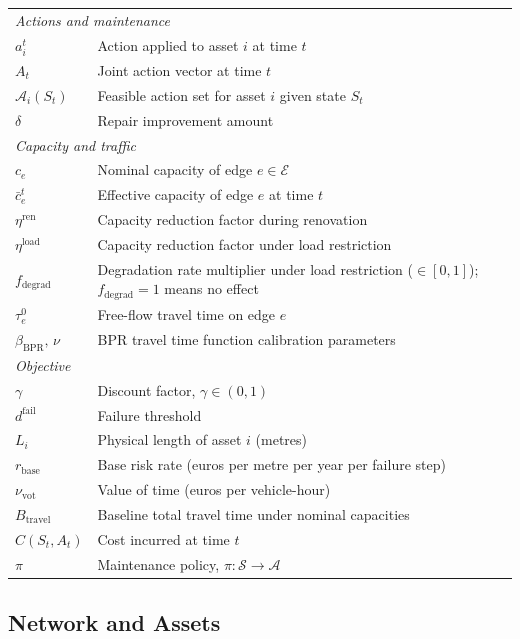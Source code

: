 \documentclass[3p, twocolumn]{elsarticle}
\begin{document}
\begin{table}[htpb]
\begin{tabular}{ll}
\hline
\multicolumn{2}{l}{\textit{Actions and maintenance}} \\
$a_i^t$ & Action applied to asset $i$ at time $t$ \\
$A_t$ & Joint action vector at time $t$ \\
$\mathcal{A}_i(S_t)$ & Feasible action set for asset $i$ given state $S_t$ \\
$\delta$ & Repair improvement amount \\
\hline
\multicolumn{2}{l}{\textit{Capacity and traffic}} \\
$c_e$ & Nominal capacity of edge $e \in \mathcal{E}$ \\
$\bar{c}_e^t$ & Effective capacity of edge $e$ at time $t$ \\
$\eta^{\text{ren}}$ & Capacity reduction factor during renovation \\
$\eta^{\text{load}}$ & Capacity reduction factor under load restriction \\
$f_{\text{degrad}}$ & Degradation rate multiplier under load restriction ($\in [0,1]$); $f_{\text{degrad}} = 1$ means no effect \\
$\tau_e^0$ & Free-flow travel time on edge $e$ \\
$\beta_{\text{BPR}},\, \nu$ & BPR travel time function calibration parameters \\
\hline
\multicolumn{2}{l}{\textit{Objective}} \\
$\gamma$ & Discount factor, $\gamma \in (0, 1)$ \\
$d^{\text{fail}}$ & Failure threshold \\
$L_i$ & Physical length of asset $i$ (metres) \\
$r_{\text{base}}$ & Base risk rate (euros per metre per year per failure step) \\
$\nu_{\text{vot}}$ & Value of time (euros per vehicle-hour) \\
$B_{\text{travel}}$ & Baseline total travel time under nominal capacities \\
$C(S_t, A_t)$ & Cost incurred at time $t$ \\
$\pi$ & Maintenance policy, $\pi: \mathcal{S} \rightarrow \mathcal{A}$ \\
\hline
\end{tabular}
\end{table}

\subsection{Network and Assets}
\label{subsec:network}
\end{document}
